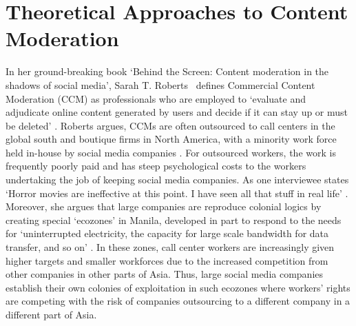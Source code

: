 
\section{Theoretical Approaches to Content Moderation}
In her ground-breaking book `Behind the Screen: Content moderation in the shadows of social media', Sarah T. Roberts~\citeyear{Roberts:2019} defines Commercial Content Moderation (CCM) as professionals who are employed to `evaluate and adjudicate online content generated by users and decide if it can stay up or must be deleted' \citep[p. 1]{Roberts:2019}. Roberts argues, CCMs are often outsourced to call centers in the global south and boutique firms in North America, with a minority work force held in-house by social media companies \citep{Roberts:2019}. For outsourced workers, the work is frequently poorly paid and has steep psychological costs to the workers undertaking the job of keeping social media companies. As one interviewee states `Horror movies are ineffective at this point. I have seen all that stuff in real life' \citep[p. 122]{Roberts:2019}. Moreover, she argues that large companies are reproduce colonial logics by creating special `ecozones' in Manila, developed in part to respond to the needs for `uninterrupted electricity, the capacity for large scale bandwidth for data transfer, and so on' \citep[p. 183]{Roberts:2019}. In these zones, call center workers are increasingly given higher targets and smaller workforces \citep[p. 178]{Roberts:2019} due to the increased competition from other companies in other parts of Asia. Thus, large social media companies establish their own colonies of exploitation in such ecozones where workers' rights are competing with the risk of companies outsourcing to a different company in a different part of Asia.

